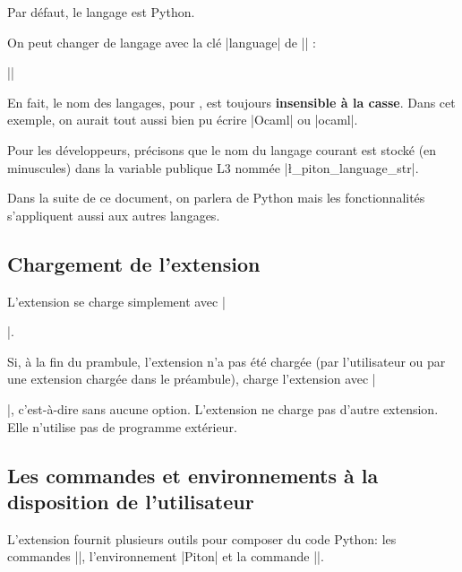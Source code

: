 \documentclass[dvipsnames,svgnames]{article}
\begin{document}
\smallskip
Par défaut, le langage est Python.

\smallskip
{}
On peut changer de langage avec la clé |language| de |\PitonOptions| : 

\smallskip
||

\smallskip
En fait, le nom des langages, pour , est toujours \textbf{insensible à la casse}. Dans cet exemple, on
aurait tout aussi bien pu écrire |Ocaml| ou |ocaml|.

\smallskip
Pour les développeurs, précisons que le nom du langage courant est stocké (en minuscules) dans la variable publique
L3 nommée |\l_piton_language_str|. 

\smallskip
Dans la suite de ce document, on parlera de Python mais les fonctionnalités s'appliquent aussi aux autres langages.



\subsection{Chargement de l'extension}


L'extension  se charge simplement avec |\usepackage{piton}|.

\smallskip
Si, à la fin du prambule, l'extension  n'a pas été chargée (par l'utilisateur ou par une extension
chargée dans le préambule),  charge l'extension  avec |\usepackage{xcolor}|, c'est-à-dire
sans aucune option. L'extension  ne charge pas d'autre extension. Elle n'utilise pas de programme
extérieur. 

\subsection{Les commandes et environnements à la disposition de l'utilisateur}


L'extension  fournit plusieurs outils pour composer du code Python: les commandes |\piton|,
l'environnement |{Piton}| et la commande |\PitonInputFile|. 
\end{document}
